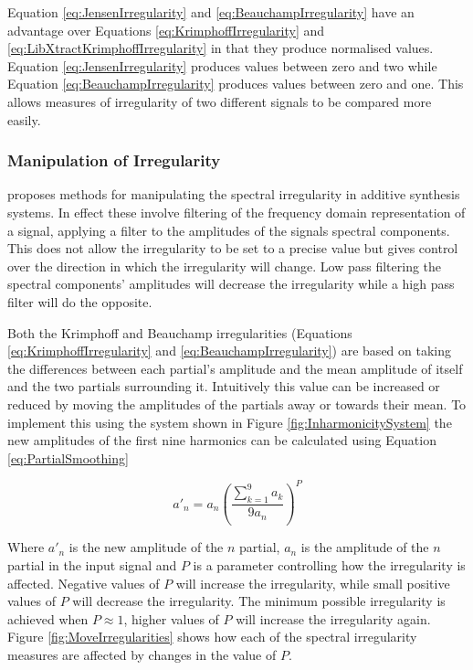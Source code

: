 		Equation \ref{eq:JensenIrregularity} and \ref{eq:BeauchampIrregularity} have an advantage over Equations
		\ref{eq:KrimphoffIrregularity} and \ref{eq:LibXtractKrimphoffIrregularity} in that they produce normalised
		values. Equation \ref{eq:JensenIrregularity} produces values between zero and two while Equation
		\ref{eq:BeauchampIrregularity} produces values between zero and one. This allows measures of irregularity
		of two different signals to be compared more easily.

		\subsubsection*{Manipulation of Irregularity}
			\citet{beauchamp2007analysis} proposes methods for manipulating the spectral irregularity in
			additive synthesis systems. In effect these involve filtering of the frequency domain
			representation of a signal, applying a filter to the amplitudes of the signals spectral components.
			This does not allow the irregularity to be set to a precise value but gives control over the
			direction in which the irregularity will change. Low pass filtering the spectral components'
			amplitudes will decrease the irregularity while a high pass filter will do the opposite.
			
			Both the Krimphoff and Beauchamp irregularities (Equations \ref{eq:KrimphoffIrregularity} and
			\ref{eq:BeauchampIrregularity}) are based on taking the differences between each partial's
			amplitude and the mean amplitude of itself and the two partials surrounding it. Intuitively this
			value can be increased or reduced by moving the amplitudes of the partials away or towards their
			mean. To implement this using the system shown in Figure \ref{fig:InharmonicitySystem} the new
			amplitudes of the first nine harmonics can be calculated using Equation \ref{eq:PartialSmoothing}

			\begin{equation}
				a'_{n} = a_{n} \left( \frac{\sum_{k = 1}^{9} a_{k}}{9a_{n}} \right) ^{P}
				\label{eq:PartialSmoothing}
			\end{equation}

			Where $a'_{n}$ is the new amplitude of the $n$ partial, $a_{n}$ is the amplitude of the
			$n$ partial in the input signal and $P$ is a parameter controlling how the irregularity
			is affected. Negative values of $P$ will increase the irregularity, while small positive values of
			$P$ will decrease the irregularity. The minimum possible irregularity is achieved when $P \approx
			1$, higher values of $P$ will increase the irregularity again. Figure \ref{fig:MoveIrregularities}
			shows how each of the spectral irregularity measures are affected by changes in the value of $P$.

